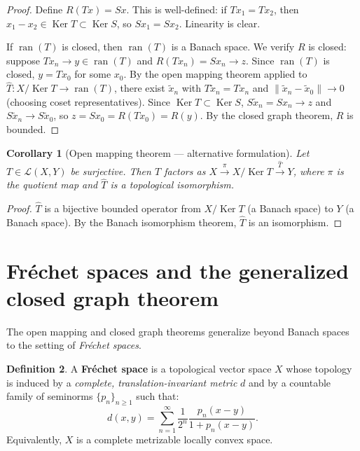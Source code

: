 \documentclass[a4paper,12pt]{book}
\DeclareMathOperator{\Ker}{Ker}
\DeclareMathOperator{\ran}{ran}
\newcommand{\norm}[1]{\left\| #1 \right\|}
\theoremstyle{definition}
\newtheorem{definition}{Definition}[chapter]
\theoremstyle{plain}
\newtheorem{corollary}[definition]{Corollary}
\theoremstyle{remark}
\begin{document}
\begin{proof}
Define $R(Tx) = Sx$. This is well-defined: if $Tx_1 = Tx_2$, then
$x_1 - x_2 \in \Ker T \subset \Ker S$, so $Sx_1 = Sx_2$. Linearity is clear.

If $\ran(T)$ is closed, then $\ran(T)$ is a Banach space. We verify $R$ is closed:
suppose $Tx_n \to y \in \ran(T)$ and $R(Tx_n) = Sx_n \to z$. Since $\ran(T)$ is
closed, $y = Tx_0$ for some $x_0$. By the open mapping theorem applied to
$\hat{T} \colon X/\Ker T \to \ran(T)$, there exist $\tilde{x}_n$ with
$T\tilde{x}_n = Tx_n$ and $\norm{\tilde{x}_n - \tilde{x}_0} \to 0$ (choosing
coset representatives). Since $\Ker T \subset \Ker S$, $S\tilde{x}_n = Sx_n \to z$
and $S\tilde{x}_n \to S\tilde{x}_0$, so $z = Sx_0 = R(Tx_0) = R(y)$. By the
closed graph theorem, $R$ is bounded.
\end{proof}

\begin{corollary}[Open mapping theorem --- alternative formulation]%
\label{cor:omt-factor}
Let $T \in \mathcal{L}(X,Y)$ be surjective. Then $T$ factors as
$X \xrightarrow{\pi} X/\Ker T \xrightarrow{\hat{T}} Y$, where $\pi$ is the
quotient map and $\hat{T}$ is a topological isomorphism.
\end{corollary}

\begin{proof}
$\hat{T}$ is a bijective bounded operator from $X/\Ker T$ (a Banach space) to $Y$
(a Banach space). By the Banach isomorphism theorem, $\hat{T}$ is an isomorphism.
\end{proof}

\section{Fr\'echet spaces and the generalized closed graph theorem}%
\label{sec:frechet}

The open mapping and closed graph theorems generalize beyond Banach spaces to the
setting of \emph{Fr\'echet spaces}.

\begin{definition}\label{def:frechet-space}
A \textbf{Fr\'echet space} is a topological vector space $X$ whose topology is
induced by a \emph{complete, translation-invariant metric} $d$ and by a countable
family of seminorms $\{p_n\}_{n \geq 1}$ such that:
\[
  d(x,y) = \sum_{n=1}^{\infty} \frac{1}{2^n}
  \frac{p_n(x-y)}{1 + p_n(x-y)}.
\]
Equivalently, $X$ is a complete metrizable locally convex space.
\end{definition}
\end{document}
